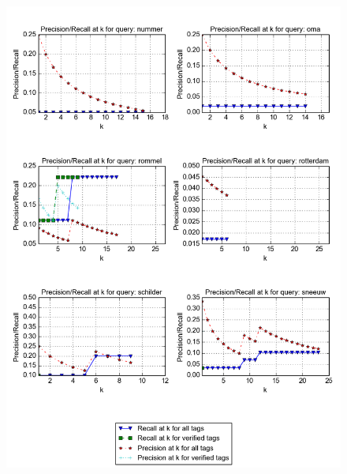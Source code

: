 \begin{figure}[H]
\centering
\includegraphics[width=\textwidth]{appendixd/queries-nummer}
\end{figure}


